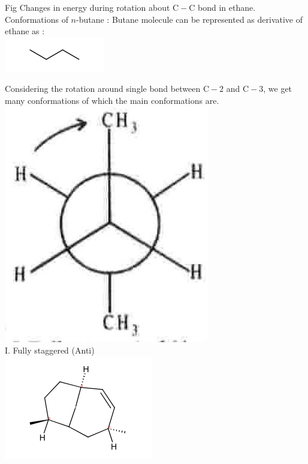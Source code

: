 \documentclass[10pt]{article}
\begin{document}
Fig Changes in energy during rotation about $\mathrm{C}-\mathrm{C}$ bond in ethane.\\
Conformations of $n$-butane : Butane molecule can be represented as derivative of ethane as :\\
\includegraphics{smile-cb8ee07314168f04db86a103512a25eb7238e260}

Considering the rotation around single bond between $\mathrm{C}-2$ and $\mathrm{C}-3$, we get many conformations of which the main conformations are.\\
\includegraphics[max width=\textwidth, center]{2025_01_28_8470952b98110cec3aabg-060(2)}\\
I. Fully staggered (Anti)\\
\includegraphics{smile-b485e54e05ab6508444aad8eb91c6c537ccf79ec}\\
\end{document}
